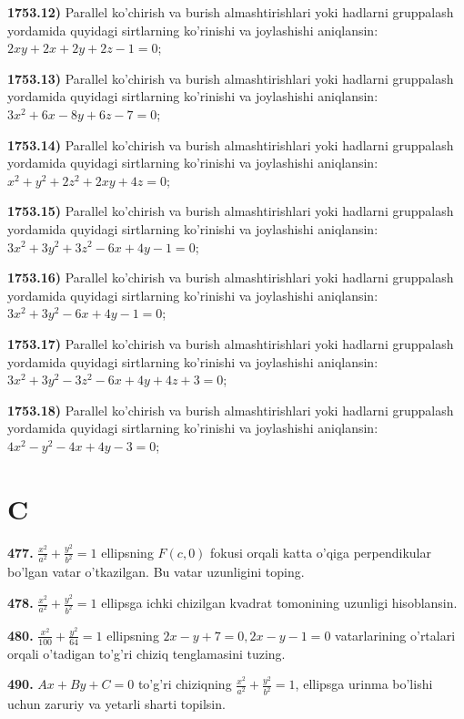 \textbf{1753.12)} Parallel ko'chirish va burish almashtirishlari yoki hadlarni gruppalash yordamida quyidagi sirtlarning ko'rinishi va joylashishi aniqlansin: $2xy + 2x + 2y + 2z - 1 = 0$;

\textbf{1753.13)} Parallel ko'chirish va burish almashtirishlari yoki hadlarni gruppalash yordamida quyidagi sirtlarning ko'rinishi va joylashishi aniqlansin: $3x^{2} + 6x - 8y + 6z - 7 = 0$;

\textbf{1753.14)} Parallel ko'chirish va burish almashtirishlari yoki hadlarni gruppalash yordamida quyidagi sirtlarning ko'rinishi va joylashishi aniqlansin: $x^{2} + y^{2} + 2z^{2} + 2xy + 4z = 0$;

\textbf{1753.15)} Parallel ko'chirish va burish almashtirishlari yoki hadlarni gruppalash yordamida quyidagi sirtlarning ko'rinishi va joylashishi aniqlansin: $3x^{2} + 3y^{2} + 3z^{2} - 6x + 4y - 1 = 0$;

\textbf{1753.16)} Parallel ko'chirish va burish almashtirishlari yoki hadlarni gruppalash yordamida quyidagi sirtlarning ko'rinishi va joylashishi aniqlansin: $3x^{2} + 3y^{2} - 6x + 4y - 1 = 0$;

\textbf{1753.17)} Parallel ko'chirish va burish almashtirishlari yoki hadlarni gruppalash yordamida quyidagi sirtlarning ko'rinishi va joylashishi aniqlansin: $3x^{2} + 3y^{2} - 3z^{2} - 6x + 4y + 4z + 3 = 0$;

\textbf{1753.18)} Parallel ko'chirish va burish almashtirishlari yoki hadlarni gruppalash yordamida quyidagi sirtlarning ko'rinishi va joylashishi aniqlansin: $4x^{2} - y^{2} - 4x + 4y - 3 = 0$;

\section{C}\label{c}

\textbf{477.} $\frac{x^{2}}{a^{2}} + \frac{y^{2}}{b^{2}} = 1$ ellipsning $F(c,0)$ fokusi orqali katta o'qiga perpendikular bo'lgan vatar o'tkazilgan. Bu vatar uzunligini toping.

\textbf{478.} $\frac{x^{2}}{a^{2}} + \frac{y^{2}}{b^{2}} = 1$ ellipsga ichki chizilgan kvadrat tomonining uzunligi hisoblansin.

\textbf{480.} $\frac{x^{2}}{100} + \frac{y^{2}}{64} = 1$ ellipsning $2x - y + 7 = 0,2x - y - 1 = 0$ vatarlarining o'rtalari orqali o'tadigan to'g'ri chiziq tenglamasini tuzing.

\textbf{490.} $Ax + By + C = 0$ to'g'ri chiziqning $\frac{x^{2}}{a^{2}} + \frac{y^{2}}{b^{2}} = 1$, ellipsga urinma bo'lishi uchun zaruriy va yetarli sharti topilsin.

